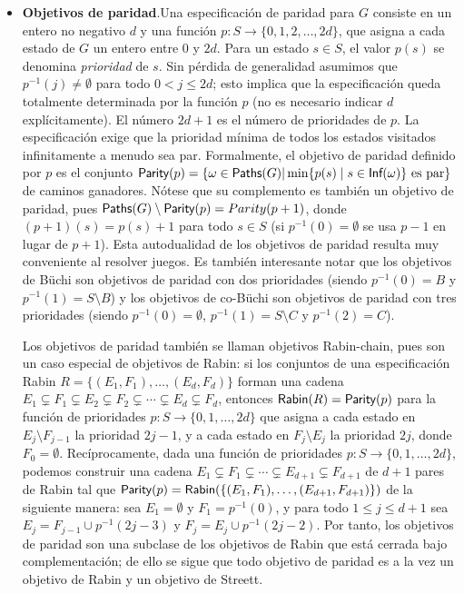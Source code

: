 \begin{itemize}
	\item \textbf{Objetivos de paridad}.Una especificación de paridad para \(G\) consiste en un entero no negativo \(d\) y una función \(p\colon S\to\{0,1,2,\dots,2d\}\), que asigna a cada estado de \(G\) un entero entre \(0\) y \(2d\). Para un estado \(s\in S\), el valor \(p(s)\) se denomina \emph{prioridad} de \(s\). Sin pérdida de generalidad asumimos que \(p^{-1}(j)\neq\emptyset\) para todo \(0<j\le2d\); esto implica que la especificación queda totalmente determinada por la función \(p\) (no es necesario indicar \(d\) explícitamente). El número \(2d+1\) es el número de prioridades de \(p\). La especificación exige que la prioridad mínima de todos los estados visitados infinitamente a menudo sea par. Formalmente, el objetivo de paridad definido por \(p\) es el conjunto \( \textsf{Parity}(p)=\{\omega\in \textsf{Paths}(G) | \min\{p(s)\mid s\in \textsf{Inf}(\omega)\}\text{ es par}\}\) de caminos ganadores. Nótese que su complemento es también un objetivo de paridad, pues \(\textsf{Paths}(G)\setminus \textsf{Parity}(p)= Parity(p+1)\), donde \((p+1)(s)=p(s)+1\) para todo \(s\in S\) (si \(p^{-1}(0)=\emptyset\) se usa \(p-1\) en lugar de \(p+1\)). Esta autodualidad de los objetivos de paridad resulta muy conveniente al resolver juegos. Es también interesante notar que los objetivos de Büchi son objetivos de paridad con dos prioridades (siendo \(p^{-1}(0)=B\) y \(p^{-1}(1)=S\setminus B\)) y los objetivos de co-Büchi son objetivos de paridad con tres prioridades (siendo \(p^{-1}(0)=\emptyset\), \(p^{-1}(1)=S\setminus C\) y \(p^{-1}(2)=C\)).

	      Los objetivos de paridad también se llaman objetivos Rabin-chain, pues son un
	      caso especial de objetivos de Rabin: si los conjuntos de una especificación
	      Rabin $R = \{(E_1,F_1),\dots,(E_d,F_d)\}$ forman una cadena \(E_1\subsetneq
	      F_1\subsetneq E_2\subsetneq F_2\subsetneq\cdots\subsetneq E_d\subsetneq F_d\),
	      entonces $\textsf{Rabin}(R) = \textsf{Parity}(p)$ para la función de prioridades $p : S \to
		      \{0,1,\dots,2d\}$ que asigna a cada estado en \(E_j\setminus F_{j-1}\) la
	      prioridad \(2j-1\), y a cada estado en \(F_j\setminus E_j\) la prioridad
	      \(2j\), donde \(F_0=\emptyset\). Recíprocamente, dada una función de
	      prioridades $ p : S \to \{0,1,\dots,2d\}$, podemos construir una cadena
	      \(E_1\subsetneq F_1\subsetneq\cdots\subsetneq E_{d+1}\subsetneq F_{d+1}\) de
	      \(d+1\) pares de Rabin tal que \( \textsf{Parity}(p) =
	      \textsf{Rabin}(\{(E_1,F_1),\dots,(E_{d+1},F_{d+1})\})\) de la siguiente manera: sea
	      \(E_1=\emptyset\) y \(F_1=p^{-1}(0)\), y para todo \(1\le j\le d+1\) sea
	      \(E_j=F_{j-1}\cup p^{-1}(2j-3)\) y \(F_j=E_j\cup p^{-1}(2j-2)\). Por tanto, los
	      objetivos de paridad son una subclase de los objetivos de Rabin que está
	      cerrada bajo complementación; de ello se sigue que todo objetivo de paridad es
	      a la vez un objetivo de Rabin y un objetivo de Streett. %


\end{itemize}
